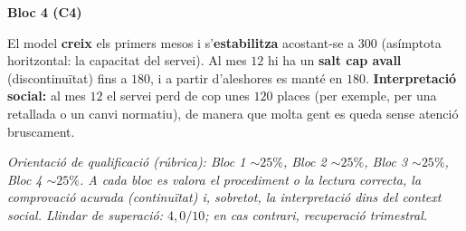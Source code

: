 \begin{solucions}
\noindent\textbf{Bloc 4 (C4)}
\begin{sollist}\setcounter{enumi}{5}
  \item El model \textbf{creix} els primers mesos i s'\textbf{estabilitza} acostant-se a
        $300$ (asímptota horitzontal: la capacitat del servei). Al mes $12$ hi ha un
        \textbf{salt cap avall} (discontinuïtat) fins a $180$, i a partir d'aleshores es
        manté en $180$. \textbf{Interpretació social:} al mes $12$ el servei perd de cop
        unes $120$ places (per exemple, per una retallada o un canvi normatiu), de
        manera que molta gent es queda sense atenció bruscament.
\end{sollist}

\end{solucions}

\noindent\small\textit{Orientació de qualificació (rúbrica): Bloc 1 $\sim 25\%$,
Bloc 2 $\sim 25\%$, Bloc 3 $\sim 25\%$, Bloc 4 $\sim 25\%$. A cada bloc es valora el
procediment o la lectura correcta, la comprovació acurada (continuïtat) i, sobretot, la
interpretació dins del context social. Llindar de superació: $4,0/10$; en cas contrari,
recuperació trimestral.}
